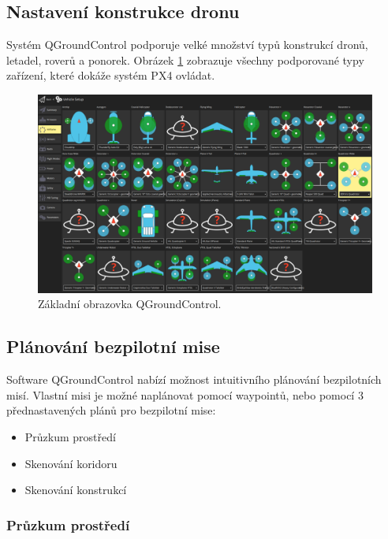 \subsection{Nastavení konstrukce dronu}

Systém QGroundControl podporuje velké množství typů konstrukcí dronů, letadel, roverů a ponorek. Obrázek \ref{fig:QGC1} zobrazuje všechny podporované typy zařízení, které dokáže systém PX4 ovládat.

\begin{figure}[!ht]
    \begin{center}
        \includegraphics[scale=0.3]{obrazky/QG2}
    \end{center}
    \caption[Základní obrazovka QGroundControl]{Základní obrazovka QGroundControl.}
    \label{fig:QGC1}
\end{figure}

\subsection{Plánování bezpilotní mise}
\label{subs:planovani}

Software QGroundControl nabízí možnost intuitivního plánování bezpilotních misí. Vlastní misi je možné naplánovat pomocí waypointů, nebo pomocí 3 přednastavených plánů pro bezpilotní mise: \cite{QGround2}

\begin{itemize}
    \item Průzkum prostředí
    \item Skenování koridoru
    \item Skenování konstrukcí
\end{itemize}

\subsubsection{Průzkum prostředí}

